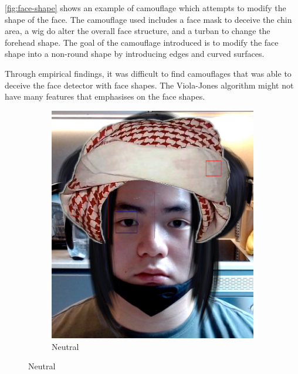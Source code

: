 \documentclass[10pt,twocolumn,letterpaper]{article}
\begin{document}
\cref{fig:face-shape} shows an example of camouflage which attempts to modify the shape of the face. The camouflage used includes a face mask to deceive the chin area, a wig do alter the overall face structure, and a turban to change the forehead shape. The goal of the camouflage introduced is to modify the face shape into a non-round shape by introducing edges and curved surfaces.

Through empirical findings, it was difficult to find camouflages that was able to deceive the face detector with face shapes. The Viola-Jones algorithm might not have many features that emphasises on the face shapes.


\begin{figure}[t]
    \centering
    \begin{subfigure}[b]{.49\linewidth}
        \centering
        \includegraphics[width=\linewidth]{Figures/face_shape_1.png}
        \caption{Neutral}
    \end{subfigure}

\end{figure}
\end{document}
